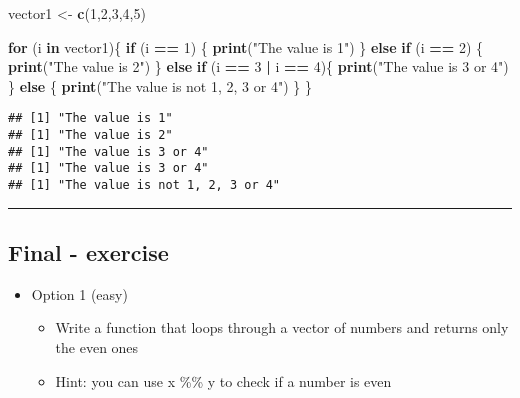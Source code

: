 \documentclass[]{article}
\newenvironment{Shaded}{\begin{snugshade}}{\end{snugshade}}
\newcommand{\ControlFlowTok}[1]{\textcolor[rgb]{0.13,0.29,0.53}{\textbf{#1}}}
\newcommand{\DecValTok}[1]{\textcolor[rgb]{0.00,0.00,0.81}{#1}}
\newcommand{\KeywordTok}[1]{\textcolor[rgb]{0.13,0.29,0.53}{\textbf{#1}}}
\newcommand{\NormalTok}[1]{#1}
\newcommand{\OperatorTok}[1]{\textcolor[rgb]{0.81,0.36,0.00}{\textbf{#1}}}
\newcommand{\StringTok}[1]{\textcolor[rgb]{0.31,0.60,0.02}{#1}}
\providecommand{\tightlist}{%
  \setlength{\itemsep}{0pt}\setlength{\parskip}{0pt}}
\begin{document}
\begin{Shaded}
\begin{Highlighting}[]
\NormalTok{vector1 <-}\StringTok{ }\KeywordTok{c}\NormalTok{(}\DecValTok{1}\NormalTok{,}\DecValTok{2}\NormalTok{,}\DecValTok{3}\NormalTok{,}\DecValTok{4}\NormalTok{,}\DecValTok{5}\NormalTok{)}

\ControlFlowTok{for}\NormalTok{ (i }\ControlFlowTok{in}\NormalTok{ vector1)\{}
  \ControlFlowTok{if}\NormalTok{ (i }\OperatorTok{==}\StringTok{ }\DecValTok{1}\NormalTok{) \{}
    \KeywordTok{print}\NormalTok{(}\StringTok{"The value is 1"}\NormalTok{)}
\NormalTok{  \} }\ControlFlowTok{else} \ControlFlowTok{if}\NormalTok{ (i }\OperatorTok{==}\StringTok{ }\DecValTok{2}\NormalTok{) \{}
    \KeywordTok{print}\NormalTok{(}\StringTok{"The value is 2"}\NormalTok{)}
\NormalTok{  \} }\ControlFlowTok{else} \ControlFlowTok{if}\NormalTok{ (i }\OperatorTok{==}\StringTok{ }\DecValTok{3} \OperatorTok{|}\StringTok{ }\NormalTok{i }\OperatorTok{==}\StringTok{ }\DecValTok{4}\NormalTok{)\{}
    \KeywordTok{print}\NormalTok{(}\StringTok{"The value is 3 or 4"}\NormalTok{)}
\NormalTok{  \} }\ControlFlowTok{else}\NormalTok{ \{}
    \KeywordTok{print}\NormalTok{(}\StringTok{"The value is not 1, 2, 3 or 4"}\NormalTok{)}
\NormalTok{  \}}
\NormalTok{\}}
\end{Highlighting}
\end{Shaded}

\begin{verbatim}
## [1] "The value is 1"
## [1] "The value is 2"
## [1] "The value is 3 or 4"
## [1] "The value is 3 or 4"
## [1] "The value is not 1, 2, 3 or 4"
\end{verbatim}

\begin{center}\rule{0.5\linewidth}{\linethickness}\end{center}

\hypertarget{final---exercise}{%
\subsection{Final - exercise}\label{final---exercise}}

\begin{itemize}
\tightlist
\item
  Option 1 (easy)

  \begin{itemize}
  \tightlist
  \item
    Write a function that loops through a vector of numbers and returns
    only the even ones
  \item
    Hint: you can use x \%\% y to check if a number is even
  \end{itemize}
\end{itemize}
\end{document}
